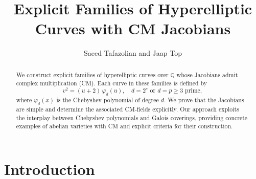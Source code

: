 \documentclass[a4paper,12pt]{amsart}
\newcommand{\QQ}{{\mathbb Q}}
\numberwithin{equation}{section}
\theoremstyle{plain}
\numberwithin{thm}{section}
\begin{document}
\title{Explicit Families of Hyperelliptic Curves with CM Jacobians}

\author{Saeed Tafazolian and Jaap Top
   }
\date{}
\address{Departamento de Matem\'{a}tica - Instituto de Matem\'{a}tica, Estat\'{i}stica e Computação Cient\'{i}fica
(IMECC) - Universidade Estadual de Campinas (UNICAMP), Rua S\'{e}rgio Buarque de Holanda, 651, Cidade Universit\'{a}ria,  Zeferino Vaz, Campinas, SP 13083-859, Brazil}
\address{Bernoulli Institute for Mathematics, Computer Science, and Artificial Intelligence,\\
Nijenborgh~9\\9747 AG Groningen\\ the Netherlands}





 
\begin{abstract}
We construct explicit families of hyperelliptic curves over $\QQ$ whose Jacobians admit complex multiplication (CM). Each curve in these families is defined by
\[
v^2 = (u+2)\,\varphi_d(u), \quad d = 2^e \text{ or } d=p \geq 3 \text{ prime},
\] 
where $\varphi_d(x)$ is the Chebyshev polynomial of degree $d$. We prove that the Jacobians are simple and determine the associated CM-fields explicitly. Our approach exploits the interplay between Chebyshev polynomials and Galois coverings, providing concrete examples of abelian varieties with CM and explicit criteria for their construction.
\end{abstract}


 


\maketitle


\section{Introduction}
\end{document}
